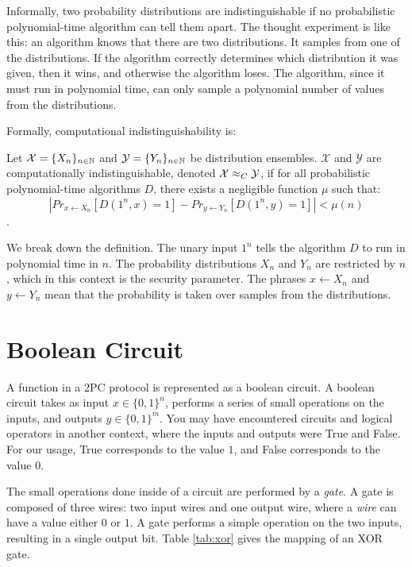 Informally, two probability distributions are indistinguishable if no probabilistic polynomial-time algorithm can tell them apart.
The thought experiment is like this: an algorithm knows that there are two distributions.
It samples from one of the distributions.
If the algorithm correctly determines which distribution it was given, then it wins, and otherwise the algorithm loses.
The algorithm, since it must run in polynomial time, can only sample a polynomial number of values from the distributions.

Formally, computational indistinguishability is:

\begin{definition}
\label{defn:computational-indistinguishability}
Let $\mathcal{X} = \{X_n\}_{n \in \mathbb{N}}$ and $\mathcal{Y} = \{Y_n\}_{n \in \mathbb{N}}$ be distribution ensembles.
$\mathcal{X}$ and $\mathcal{Y}$ are computationally indistinguishable, denoted $\mathcal{X} \approx_C \mathcal{Y}$, if for all probabilistic polynomial-time algorithms $D$, there exists a negligible function $\mu$ such that:
\begin{equation}
    |Pr_{x \gets X_n} [D(1^n, x) = 1] - Pr_{y \gets Y_n} [D(1^n, y) = 1]| < \mu(n)
\end{equation}
\cite{katzlindelltextbook}.
\end{definition}

We break down the definition.
The unary input $1^n$ tells the algorithm $D$ to run in polynomial time in $n$.
The probability distributions $X_n$ and $Y_n$ are restricted by $n$, which in this context is the security parameter.
The phrases $x \gets X_n$ and $y \gets Y_n$ mean that the probability is taken over samples from the distributions.

\section{Boolean Circuit} 
A function in a 2PC protocol is represented as a boolean circuit.
A boolean circuit takes as input $x \in \{0,1\}^n$, performs a series of small operations on the inputs, and outputs $y \in \{0,1\}^m$.  
You may have encountered circuits and logical operators in another context, where the inputs and outputs were True and False.
For our usage, True corresponds to the value $1$, and False corresponds to the value $0$. 

The small operations done inside of a circuit are performed by a \emph{gate}.
A gate is composed of three wires: two input wires and one output wire, where a \emph{wire} can have a value either $0$ or $1$.
A gate performs a simple operation on the two inputs, resulting in a single output bit.
Table \ref{tab:xor} gives the mapping of an XOR gate.

